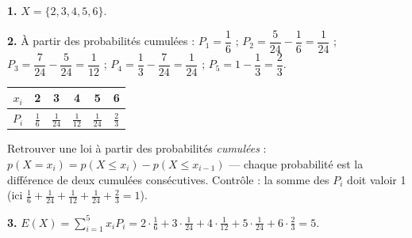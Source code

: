 \documentclass[11pt]{article}
\begin{document}
\textbf{1.} $X = \{2, 3, 4, 5, 6\}$.

\textbf{2.} À partir des probabilités cumulées : $P_1 = \dfrac{1}{6}$ ; $P_2 = \dfrac{5}{24} - \dfrac{1}{6} = \dfrac{1}{24}$ ; $P_3 = \dfrac{7}{24} - \dfrac{5}{24} = \dfrac{1}{12}$ ; $P_4 = \dfrac{1}{3} - \dfrac{7}{24} = \dfrac{1}{24}$ ; $P_5 = 1 - \dfrac{1}{3} = \dfrac{2}{3}$.
\begin{center}\renewcommand{\arraystretch}{1.5}
\begin{tabular}{|c|c|c|c|c|c|}
\hline $x_i$ & 2 & 3 & 4 & 5 & 6 \\\hline $P_i$ & $\frac{1}{6}$ & $\frac{1}{24}$ & $\frac{1}{12}$ & $\frac{1}{24}$ & $\frac{2}{3}$ \\\hline
\end{tabular}
\end{center}

\begin{methode}
Retrouver une loi à partir des probabilités \emph{cumulées} :
$p(X = x_i) = p(X \le x_i) - p(X \le x_{i-1})$ — chaque probabilité est
la différence de deux cumulées consécutives. Contrôle : la somme des
$P_i$ doit valoir 1 (ici $\frac{1}{6} + \frac{1}{24} + \frac{1}{12} +
\frac{1}{24} + \frac{2}{3} = 1$).
\end{methode}

\textbf{3.} $E(X) = \displaystyle\sum_{i=1}^5 x_i P_i = 2\cdot\tfrac{1}{6} + 3\cdot\tfrac{1}{24} + 4\cdot\tfrac{1}{12} + 5\cdot\tfrac{1}{24} + 6\cdot\tfrac{2}{3} = 5$.
\end{document}
